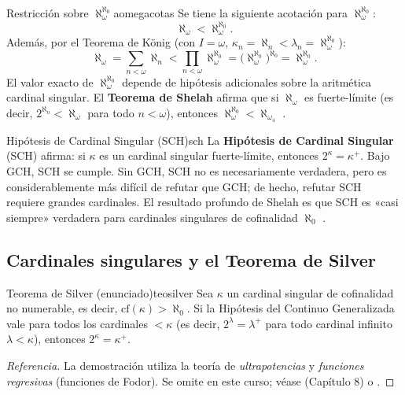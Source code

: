 \begin{corolario}{Restricción sobre $\aleph_\omega^{\aleph_0}$}{aomegacotas}
Se tiene la siguiente acotación para $\aleph_\omega^{\aleph_0}$:
\[
  \aleph_\omega < \aleph_\omega^{\aleph_0}.
\]
Además, por el Teorema de König (con $I = \omega$, $\kappa_n = \aleph_n < \lambda_n = \aleph_\omega^{\aleph_0}$):
\[
  \aleph_\omega = \sum_{n < \omega} \aleph_n < \prod_{n<\omega} \aleph_\omega^{\aleph_0} = \bigl(\aleph_\omega^{\aleph_0}\bigr)^{\aleph_0} = \aleph_\omega^{\aleph_0}.
\]
El valor exacto de $\aleph_\omega^{\aleph_0}$ depende de hipótesis adicionales sobre la aritmética cardinal singular. El \textbf{Teorema de Shelah} afirma que si $\aleph_\omega$ es fuerte-límite (es decir, $2^{\aleph_n} < \aleph_\omega$ para todo $n < \omega$), entonces $\aleph_\omega^{\aleph_0} < \aleph_{\omega_4}$ \cite{shelah1994}.
\end{corolario}

\begin{observacion}{Hipótesis de Cardinal Singular (SCH)}{sch}
La \textbf{Hipótesis de Cardinal Singular} (SCH) afirma: si $\kappa$ es un cardinal singular fuerte-límite, entonces $2^\kappa = \kappa^+$. Bajo GCH, SCH se cumple. Sin GCH, SCH no es necesariamente verdadera, pero es considerablemente más difícil de refutar que GCH; de hecho, refutar SCH requiere grandes cardinales. El resultado profundo de Shelah es que SCH es «casi siempre» verdadera para cardinales singulares de cofinalidad $\aleph_0$ \cite{shelah1994, jech2003}.
\end{observacion}

\subsection{Cardinales singulares y el Teorema de Silver}

\begin{teorema}{Teorema de Silver (enunciado)}{teosilver}
Sea $\kappa$ un cardinal singular de cofinalidad no numerable, es decir, $\mathrm{cf}(\kappa) > \aleph_0$. Si la Hipótesis del Continuo Generalizada vale para todos los cardinales $< \kappa$ (es decir, $2^\lambda = \lambda^+$ para todo cardinal infinito $\lambda < \kappa$), entonces $2^\kappa = \kappa^+$.
\end{teorema}

\begin{proof}[Referencia]
La demostración utiliza la teoría de \emph{ultrapotencias} y \emph{funciones regresivas} (funciones de Fodor). Se omite en este curso; véase \cite{jech2003} (Capítulo 8) o \cite{kunen2011} \cite{silver1975}.
\end{proof}


